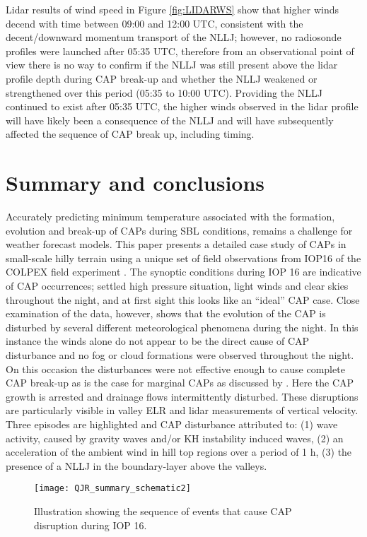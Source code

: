 \documentclass[times]{qjrms4}
\begin{document}
Lidar results of wind speed in Figure \ref{fig:LIDARWS} show that higher winds decend with time between 09:00 and 12:00 UTC, consistent with the decent/downward momentum transport of the NLLJ; however, no radiosonde profiles were launched after 05:35 UTC, therefore from an observational point of view there is no way to confirm if the NLLJ was still present above the lidar profile depth during CAP break-up and whether the NLLJ weakened or strengthened over this period (05:35 to 10:00 UTC). Providing the NLLJ continued to exist after 05:35 UTC, the higher winds observed in the lidar profile will have likely been a consequence of the NLLJ and will have subsequently affected the sequence of CAP break up, including timing.

\section{Summary and conclusions}
\label{summary}
Accurately predicting minimum temperature associated with the formation, evolution and break-up of CAPs during SBL conditions, remains a challenge for weather forecast models. This paper presents a detailed case study of CAPs in small-scale hilly terrain using a unique set of field observations from IOP16 of the COLPEX field experiment \citep{price2010COLPEX}. The synoptic conditions during IOP 16 are indicative of CAP occurrences; settled high pressure situation, light winds and clear skies throughout the night, and at first sight this looks like an ``ideal'' CAP case. Close examination of the data, however, shows that the evolution of the CAP is disturbed by several different meteorological phenomena during the night. In this instance the winds alone do not appear to be the direct cause of CAP disturbance and no fog or cloud formations were observed throughout the night. On this occasion the disturbances were not effective enough to cause complete CAP break-up as is the case for marginal CAPs as discussed by \citep{mahrt2015common}. Here the CAP growth is arrested and drainage flows intermittently disturbed. These disruptions are particularly visible in valley ELR and lidar measurements of vertical velocity. Three episodes are highlighted and CAP disturbance attributed to: (1) wave activity, caused by gravity waves and/or KH instability induced waves, (2) an acceleration of the ambient wind in hill top regions over a period of 1 h, (3) the presence of a NLLJ in the boundary-layer above the valleys.
       \begin{figure*}
        \centering
        \texttt{[image: QJR\_summary\_schematic2]}
        \caption{Illustration showing the sequence of events that cause CAP disruption during IOP 16.}
        \label{fig:schematic}
        \end{figure*}
\end{document}
